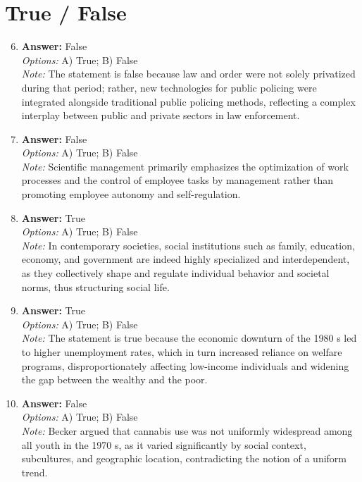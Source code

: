 \documentclass[12pt]{article}
\begin{document}
\section*{True / False}
\begin{enumerate}[label=\arabic*.]
\setcounter{enumi}{5}
\item \textbf{Answer:} False
\\ \textit{Options:} A) True; B) False
\\ \textit{Note:} The statement is false because law and order were not solely privatized during that period; rather, new technologies for public policing were integrated alongside traditional public policing methods, reflecting a complex interplay between public and private sectors in law enforcement.
\item \textbf{Answer:} False
\\ \textit{Options:} A) True; B) False
\\ \textit{Note:} Scientific management primarily emphasizes the optimization of work processes and the control of employee tasks by management rather than promoting employee autonomy and self-regulation.
\item \textbf{Answer:} True
\\ \textit{Options:} A) True; B) False
\\ \textit{Note:} In contemporary societies, social institutions such as family, education, economy, and government are indeed highly specialized and interdependent, as they collectively shape and regulate individual behavior and societal norms, thus structuring social life.
\item \textbf{Answer:} True
\\ \textit{Options:} A) True; B) False
\\ \textit{Note:} The statement is true because the economic downturn of the 1980 s led to higher unemployment rates, which in turn increased reliance on welfare programs, disproportionately affecting low-income individuals and widening the gap between the wealthy and the poor.
\item \textbf{Answer:} False
\\ \textit{Options:} A) True; B) False
\\ \textit{Note:} Becker argued that cannabis use was not uniformly widespread among all youth in the 1970 s, as it varied significantly by social context, subcultures, and geographic location, contradicting the notion of a uniform trend.
\end{enumerate}
\end{document}

